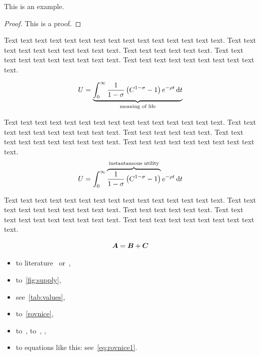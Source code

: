 \begin{exam}\label{ex:priklad1}
This is an example.
\end{exam}

\begin{proof}
This is a proof.
\end{proof}



Text text text text text text text text text text text text text text text. Text text text text text text text text text text. Text text text text text text. Text text text text text text text text text text. Text text text text text text text text text text.

    \[ U = \underbrace{\int_0^{\infty} \frac{1}{1-\sigma}\left(C^{1-\sigma} -1 \right) e^{-\rho t} \,\mathrm{d} t}_\text{meaning of life} \]


Text text text text text text text text text text text text text text text. Text text text text text text text text text text. Text text text text text text. Text text text text text text text text text text. Text text text text text text text text text text.
\begin{equation}\label{eq:rovnice1}
    U = \int_0^{\infty} \overbrace{ \frac{1}{1-\sigma}\left(C^{1-\sigma} -1 \right)}^\text{instantaneous utility} e^{-\rho t} \,\mathrm{d} t
\end{equation}


Text text text text text text text text text text text text text text text. Text text text text text text text text text text. Text text text text text text. Text text text text text text text text text text. Text text text text text text text text text text.

\begin{equation}\label{eq:rovnice2}
    \mbox{\boldmath $A$} = \mbox{\boldmath $B$} + \mbox{\boldmath $C$}
\end{equation}


\begin{itemize}
    \item to literature~\citep[pg.~10]{Bjorvatn2006} 	
            or~\citet[pg.~10]{Haufler2006},
    \item to~\autoref{fig:supply},														%
    \item see~\autoref{tab:values},
    \item to~\autoref{rovnice},
    \item to~, to~,
            , 
    \item to equations like this: see~\eqref{eq:rovnice1}.
\end{itemize}


